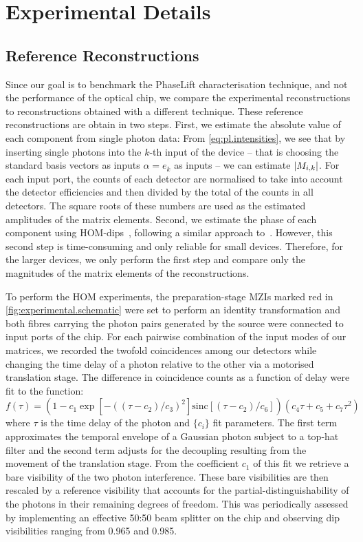 \section{Experimental Details}%
\label{sec:pl.experimental_details}

\subsection{Reference Reconstructions}%
\label{sub:pl.hom_dip}

Since our goal is to benchmark the PhaseLift characterisation technique, and not the performance of the optical chip, we compare the experimental reconstructions to reconstructions obtained with a different technique.
These reference reconstructions are obtain in two steps.
First, we estimate the absolute value of each component from single photon data:
From \cref{eq:pl.intensities}, we see that by inserting single photons into the $k$-th input of the device -- that is choosing the standard basis vectors as inputs $\alpha =  e_k$ as inputs --  we can estimate ${\vert M_{i,k}\vert}$.
For each input port, the counts of each detector are normalised to take into account the detector efficiencies and then divided by the total of the counts in all detectors.
The square roots of these numbers are used as the estimated amplitudes of the matrix elements.
Second, we estimate the phase of each component using HOM-dips~\cite{Hong_1987_Measurement}, following a similar approach to~\cite{Laing_2012_SuperStable,Dhand_2016_Accurate}.
However, this second step is time-consuming and only reliable for small devices.
Therefore, for the larger devices, we only perform the first step and compare only the magnitudes of the matrix elements of the reconstructions.

To perform the HOM experiments, the preparation-stage MZIs marked red in \cref{fig:experimental.schematic} were set to perform an identity transformation and both fibres carrying the photon pairs generated by the source were connected to input ports of the chip.
For each pairwise combination of the input modes of our matrices, we recorded the twofold coincidences among our detectors while changing the time delay of a photon relative to the other via a motorised translation stage.
The difference in coincidence counts as a function of delay were fit to the function:
\[
  f(\tau)=\left(1-c_1\exp[-((\tau - c_2)/c_3)^2]\mathrm{sinc}[(\tau - c_2)/c_6]\right)(c_4\tau + c_5 + c_7 \tau^2)
\]
where $\tau$ is the time delay of the photon and $\{c_i\}$ fit parameters.
The first term approximates the temporal envelope of a Gaussian photon subject to a top-hat filter and the second term adjusts for the decoupling resulting from the movement of the translation stage.
From the coefficient $c_1$ of this fit we retrieve a bare visibility of the two photon interference.
These bare visibilities are then rescaled by a reference visibility that accounts for the partial-distinguishability of the photons in their remaining degrees of freedom.
This was periodically assessed by implementing an effective 50:50 beam splitter on the chip and observing dip visibilities ranging from 0.965 and 0.985.

